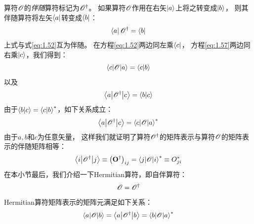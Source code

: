 算符$\mathscr{O}$的\emph{伴随}算符标记为$\mathscr O^\dagger$。
如果算符$\mathscr{O}$作用在右矢$\Ket{a}$上将之转变成$\Ket{b}$，
则其伴随算符将左矢$\Bra{a}$转变成$\Bra{b}$：
\begin{equation}
 \Bra{a}\mathscr O^\dagger = \Bra{b}
 \label{eq:1.57}
\end{equation}
上式与式\eqref{eq:1.52}互为伴随。
在方程\eqref{eq:1.52}两边同左乘$\Bra{c}$，
方程\eqref{eq:1.57}两边同右乘$\Ket{c}$，我们得到：
\[
\left\langle c\middle\vert \mathscr{O} \middle\vert a\right\rangle = \langle c \vert b \rangle
\]
以及
\[
\left\langle a\middle\vert \mathscr O^\dagger\middle\vert c\right\rangle = \langle b \vert c \rangle
\]
由于$\langle b \vert c \rangle = {\langle c \vert b \rangle}^\ast$，如下关系成立：
\begin{equation}
 \left\langle a\middle\vert \mathscr O^\dagger\middle\vert c\right\rangle = {\left\langle c\middle\vert \mathscr{O} \middle\vert a\right\rangle}^\ast
 \label{eq:1.58}
\end{equation}
由于$a, b$和$c$为任意矢量，
这样我们就证明了算符$\mathscr O^\dagger$的矩阵表示与算符$\mathscr{O}$的矩阵表示的伴随矩阵相等：
\begin{equation}
 \left\langle i\middle\vert \mathscr O^\dagger\middle\vert j\right\rangle \equiv \left(\mathbf{O}^\dagger\right)_{ij} = {\left\langle j\middle\vert \mathscr{O} \middle\vert i\right\rangle}^\ast \equiv O_{ji}^\ast
 \label{eq:1.59}
\end{equation}
在本小节最后，我们介绍一下Hermitian算符，即自伴算符：
\begin{equation}
 \mathscr{O} = \mathscr O^\dagger
 \label{eq:1.60}
\end{equation}
Hermitian算符矩阵表示的矩阵元满足如下关系：
\begin{equation}
 \left\langle a\middle\vert \mathscr{O} \middle\vert b\right\rangle = \left\langle a\middle\vert \mathscr O^\dagger\middle\vert b\right\rangle = {\left\langle b\middle\vert \mathscr{O} \middle\vert a\right\rangle}^\ast
 \label{eq:1.61}
\end{equation}


